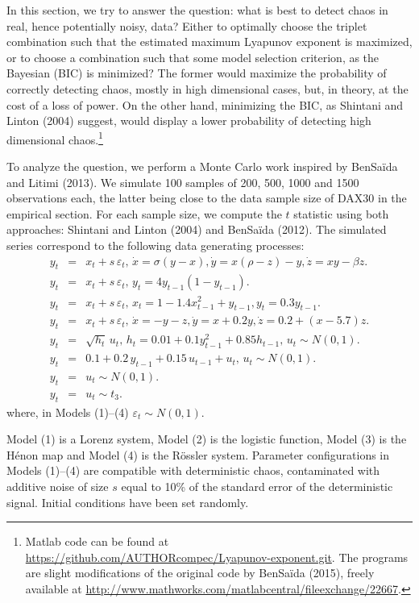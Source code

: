 \documentclass[12pt]{article}
\begin{document}
In this section, we try to answer the question: what is best to detect chaos in real, hence potentially noisy, data? Either to optimally choose the
triplet combination such that the estimated maximum Lyapunov exponent is maximized, or to choose a combination such that some
model selection criterion, as the Bayesian (BIC) is minimized? The former would maximize the probability of correctly detecting chaos, mostly in high dimensional cases, but, in theory, at the cost of a loss of power. On the other hand, minimizing the BIC, as Shintani and Linton (2004) suggest, would display a lower probability of detecting high dimensional chaos.\footnote{Matlab code can be found at \url{https://github.com/AUTHORcompec/Lyapunov-exponent.git}. The programs are slight modifications of the original code by BenSa\"{i}da (2015), freely available at \url{http://www.mathworks.com/matlabcentral/fileexchange/22667}.}

To analyze the question, we perform a Monte Carlo work inspired by BenSa\"{i}da and Litimi (2013). We simulate 100 samples of 200, 500, 1000 and 1500 observations each, the latter being close to the data sample size of DAX30 in the empirical section. For each sample size, we compute the $t$ statistic using both approaches: Shintani and Linton (2004) and BenSa\"{i}da (2012). The simulated series correspond to the following data generating processes:
\setcounter{equation}{0}
\begin{eqnarray}
y_{t} & = & x_{t}+s\, \varepsilon_{t},\,\dot x=\sigma(y-x), \dot y =x(\rho-z)- y, \dot z=x y-\beta z.\\
y_{t} & = & x_{t}+s\, \varepsilon_{t},\,y_{t}=4 y_{t-1} (1-y_{t-1}).\\
y_{t} & = & x_{t}+s\, \varepsilon_{t},\,x_{t}=1-1.4 x^{2}_{t-1}+y_{t-1}, y_{t}=0.3 y_{t-1}.\\
y_{t} & = & x_{t}+s\, \varepsilon_{t},\,\dot x=-y-z, \dot y =x+0.2 y, \dot z=0.2+(x-5.7) z.\\
y_{t} & = & \sqrt{h_{t}}\,u_{t},\, h_{t}=0.01+0.1 y_{t-1}^2+0.85 h_{t-1},\,u_{t}\sim N(0,1).\\
y_{t} & = & 0.1+0.2\,y_{t-1}+0.15\,u_{t-1}+u_{t},\,u_{t}\sim N(0,1).\\
y_{t} & = & u_{t}\sim N(0,1).\\
y_{t} & = & u_{t}\sim t_3.
\end{eqnarray}
where, in Models (1)--(4)
$\varepsilon_{t}\sim N(0,1)$.

Model (1) is a Lorenz system,
Model (2) is the logistic function, 
Model (3) is the H\'enon map
and Model (4) is the R\"ossler system. Parameter configurations in Models (1)--(4) are compatible with deterministic chaos, contaminated with additive noise of size $s$ equal to 10\% of the standard error of the deterministic signal. Initial conditions have been set randomly.
\end{document}
